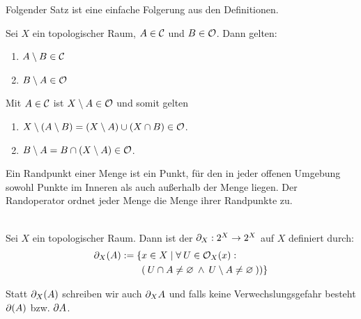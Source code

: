     Folgender Satz ist eine einfache Folgerung aus den Definitionen.
    \begin{satz}\label{satz:differenz}%
        Sei $X$ ein topologischer Raum, $A\in \mathcal{C}$ und $B \in \mathcal{O}$. Dann gelten:
        \begin{enumerate}
            \item $A \setminus B \in \mathcal{C}$
            \item $B \setminus A \in \mathcal{O}$
        \end{enumerate}    
    \end{satz}
    
    \begin{bew}
        Mit $A \in \mathcal{C}$ ist $X\setminus A \in \mathcal{O}$ und somit gelten
        \begin{enumerate}
            \item $X \setminus (A \setminus B) = (X \setminus A) \cup (X \cap B) \in \mathcal{O}$.
            \item $B \setminus A = B \cap (X \setminus A) \in \mathcal{O}$.
        \end{enumerate}
    \end{bew}


    Ein
    Randpunkt einer Menge ist ein Punkt, für den in jeder offenen Umgebung sowohl Punkte im Inneren als auch außerhalb der Menge liegen. Der Randoperator ordnet jeder Menge die Menge ihrer Randpunkte zu.

    \begin{dfn}[Randoperator] \label{def:rand} \ \\
        Sei $X$ ein topologischer Raum. Dann ist der  $\partial_X : 2^X \rightarrow 2^X$ auf $X$ definiert durch:
        \begin{align*}
            \partial_X(A) := \{&x \in X \mid \forall\: U \in \mathcal{O}_X(x) :\\ 
            &(\: U \cap A \neq \varnothing \:\land\: U \setminus A \neq \varnothing \:))\}
        \end{align*}
        
    \end{dfn}

    
    \begin{konv}
        Statt $\partial_X(A)$ schreiben wir auch $\partial_X A$ und falls keine Verwechslungsgefahr besteht $\partial(A)$ bzw. $\partial A$.
    \end{konv}

